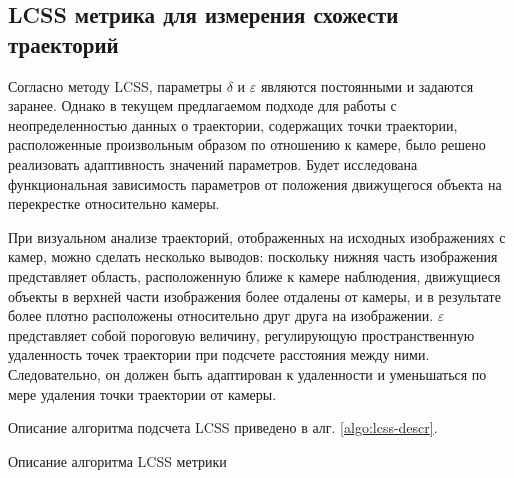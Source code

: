 \subsection{LCSS метрика для измерения схожести траекторий}

Согласно методу LCSS, параметры $\delta$ и $\varepsilon$ являются постоянными и задаются заранее. Однако в текущем предлагаемом подходе для работы с неопределенностью данных о траектории, содержащих точки траектории, расположенные произвольным образом по отношению к камере, было решено реализовать адаптивность значений параметров. Будет исследована функциональная зависимость параметров от положения движущегося объекта на перекрестке относительно камеры.

При визуальном анализе траекторий, отображенных на исходных изображениях с камер, можно сделать несколько выводов: поскольку нижняя часть изображения представляет область, расположенную ближе к камере наблюдения, движущиеся объекты в верхней части изображения более отдалены от камеры, и в результате более плотно расположены относительно друг друга на изображении. $\varepsilon$ представляет собой пороговую величину, регулирующую пространственную удаленность точек траектории при подсчете расстояния между ними. Следовательно, он должен быть адаптирован к удаленности и уменьшаться по мере удаления точки траектории от камеры.

Описание алгоритма подсчета LCSS приведено в алг. \ref{algo:lcss-descr}.

\begin{algorithm}[!htb]
	\caption{Описание алгоритма LCSS метрики}
	\label{algo:lcss-descr}
	\SetAlgoLined
\end{algorithm}

